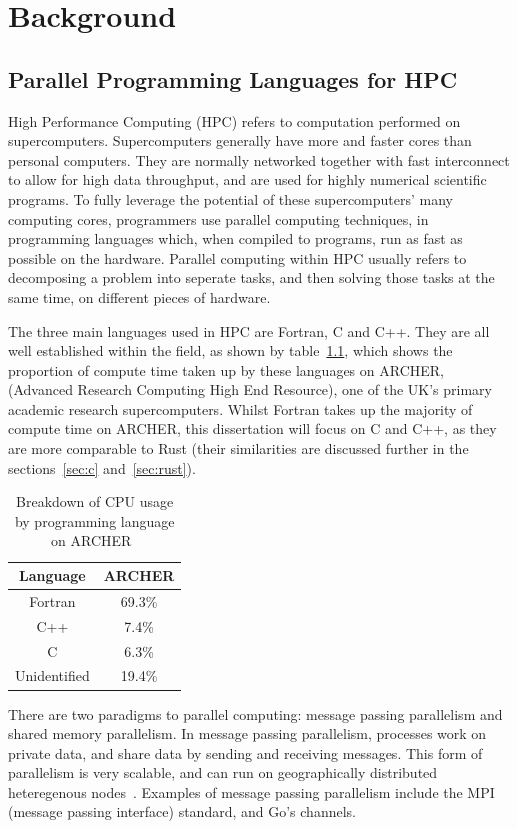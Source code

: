 \chapter{Background}
\section{Parallel Programming Languages for HPC}
High Performance Computing (HPC) refers to computation performed on supercomputers. 
Supercomputers generally have more and faster cores than personal computers. They are normally networked together with fast interconnect to allow for high data throughput, and are used for highly numerical scientific programs.
To fully leverage the potential of these supercomputers' many computing cores, programmers use parallel computing techniques, in programming languages which, when compiled to programs, run as fast as possible on the hardware. Parallel computing within HPC usually refers to decomposing a problem into seperate tasks, and then solving those tasks at the same time, on different pieces of hardware.

The three main languages used in HPC are Fortran, C and C++. They are all well established within the field, as shown by table~\ref{tab:langs}, which shows the proportion of compute time taken up by these languages on ARCHER, (Advanced Research Computing High End Resource), one of the UK's primary academic research supercomputers.
Whilst Fortran takes up the majority of compute time on ARCHER, this dissertation will focus on C and C++, as they are more comparable to Rust (their similarities are discussed further in the sections~\ref{sec:c} and~\ref{sec:rust}).

\begin{table}[h]
  \centering
  \begin{tabular}{|c|c|}
    \hline
    Language & \textbf{ARCHER} \\
    \hline
    Fortran & 69.3\% \\
    \hline
    C++ & 7.4\% \\
    \hline
    C & 6.3\% \\
    \hline
    Unidentified & 19.4\% \\
    \hline
  \end{tabular}
  \caption{Breakdown of CPU usage by programming language on ARCHER~\cite{Turner2015}}
  \label{tab:langs}
\end{table}

There are two paradigms to parallel computing: message passing parallelism and shared memory parallelism. In message passing parallelism, processes work on private data, and share data by sending and receiving messages. This form of parallelism is very scalable, and can run on geographically distributed heteregenous nodes~\cite{SETI}. Examples of message passing parallelism include the MPI (message passing interface) standard, and Go's channels.

